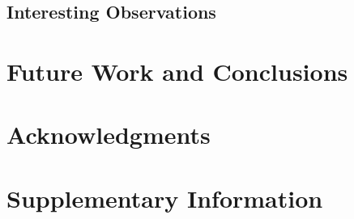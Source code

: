 \documentclass[fleqn,10pt,onecolumn]{ipcc} %
\begin{document}
\subsection{Interesting Observations}

\section{Future Work and Conclusions}

\section*{Acknowledgments} %


\newpage
{}



\section*{Supplementary Information} %

\end{document}
